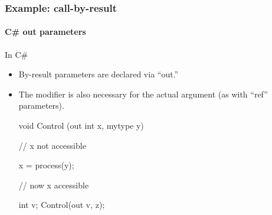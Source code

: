 \documentclass{beamer}
\begin{document}
\begin{frame}[fragile]
\frametitle{Example: call-by-result}
\framesubtitle{C\# out parameters}
In C\# 
\begin{itemize}
\item By-result parameters are declared via ``out.'' 
\item The modifier 
is also necessary for the actual argument
(as with ``ref'' parameters).

\begin{cplus3}
void Control (out int x, mytype y)
{
     // x not accessible

     x = process(y);
  
     // now x accessible    
}

int v;
Control(out v, z);
\end{cplus3}
\end{itemize}
\end{frame}
\end{document}
